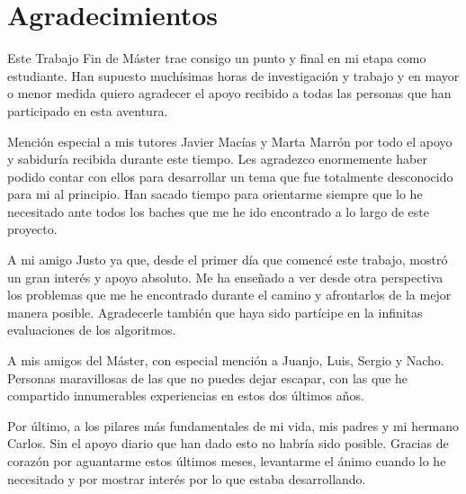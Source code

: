 
\chapter*{Agradecimientos}
\label{cha:agradecimientos}

Este Trabajo Fin de Máster trae consigo un punto y final en mi etapa como estudiante. Han supuesto muchísimas horas de investigación y trabajo y en mayor o menor medida quiero agradecer el apoyo recibido a todas las personas que han participado en esta aventura.

Mención especial a mis tutores Javier Macías y Marta Marrón por todo el apoyo y sabiduría recibida durante este tiempo. Les agradezco enormemente haber podido contar con ellos para desarrollar un tema que fue totalmente desconocido para mi al principio. Han sacado tiempo para orientarme siempre que lo he necesitado ante todos los baches que me he ido encontrado a lo largo de este proyecto.

A mi amigo Justo ya que, desde el primer día que comencé este trabajo, mostró un gran interés y apoyo absoluto. Me ha enseñado a ver desde otra perspectiva los problemas que me he encontrado durante el camino y afrontarlos de la mejor manera posible. Agradecerle también que haya sido partícipe en la infinitas evaluaciones de los algoritmos.

A mis amigos del Máster, con especial mención a Juanjo, Luis, Sergio y Nacho. Personas maravillosas de las que no puedes dejar escapar, con las que he compartido innumerables experiencias en estos dos últimos años.

Por último, a los pilares más fundamentales de mi vida, mis padres y mi hermano Carlos. Sin el apoyo diario que han dado esto no habría sido posible. Gracias de corazón por aguantarme estos últimos meses, levantarme el ánimo cuando lo he necesitado y por mostrar interés por lo que estaba desarrollando. 